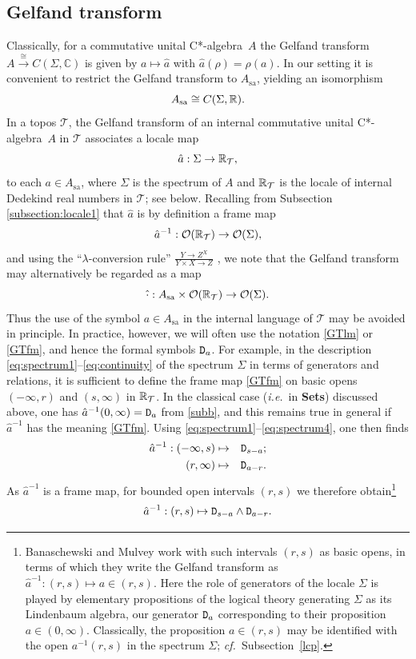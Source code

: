 \documentclass[12pt]{article}
\newcommand{\beq}{\begin{equation}}
\newcommand{\eeq}{\end{equation}}
\newcommand{\Sets}{\mbox{\textbf{Sets}}}
\newcommand{\ca}{C*-algebra} \newcommand{\jba}{JB-algebra}
\newcommand{\raw}{\rightarrow} \newcommand{\rat}{\mapsto}
\newcommand{\inv}{^{-1}}
\newcommand{\er}{\eqref}
\newcommand{\lm}{\lambda} \newcommand{\Lm}{\Lambda}
\newcommand{\rh}{\rho} \newcommand{\sg}{\sigma}
\newcommand{\Sg}{\Sigma} \newcommand{\ta}{\tau} \newcommand{\ph}{\phi}
\newcommand{\CO}{{\mathcal O}} \newcommand{\CP}{{\mathcal P}}
\newcommand{\CT}{{\mathcal T}} \newcommand{\CV}{{\mathcal V}}
\newcommand{\C}{{\mathbb C}} \newcommand{\D}{{\mathbb D}}
\newcommand{\sa}{\ensuremath{_{\mathrm{sa}}}}
\newcommand{\prop}[1]{\ensuremath{\mbox{\texttt{#1}}}}
\newcommand{\ie}{\textit{i.e.}}
\begin{document}
\subsection{Gelfand transform}\label{sec:GT}

Classically, for a commutative unital \ca\ $A$ the Gelfand transform
$A\stackrel{\cong}{\raw} C(\Sigma,\C)$
 is given by $a\mapsto \hat{a}$ with $\hat{a}(\rh)=\rh(a)$. In our setting it is
 convenient to restrict the Gelfand transform to $A\sa$, yielding an isomorphism
 \beq
 A\sa\cong C(\Sg,\R)  \label{GTisoR}.
 \eeq
 In a topos $\CT$,
 the Gelfand transform of an internal commutative unital \ca\ ${A}$ in $\CT$
associates a locale map
\beq \hat{a}:\Sg\raw \R_{\CT},\label{GTlm}\eeq
 to each $a\in{A\sa}$, where
$\Sg$ is the spectrum of ${A}$ and
 $\R_{\CT}$ is the locale of internal Dedekind real numbers in
$\CT$; see below. Recalling from Subsection \ref{subsection:locale1} that
 $\hat{a}$ is by definition a frame map
 \beq \hat{a}\inv: \CO(\R_{\CT})\raw\CO(\Sg), \label{GTfm}\eeq
 and using the ``$\lm$-conversion rule'' $\frac{Y\raw Z^X}{Y\times X\raw Z}$
  \cite[\S I.6]{maclanemoerdijk92},
 we note that  the Gelfand transform may alternatively  be regarded as a map
\beq
\hat{\cdot}: A\sa\times \CO(\R_{\CT})\raw \CO(\Sg).\label{GTlc}\eeq
 Thus
 the use of the symbol $a\in A\sa$ in the internal language of $\CT$ may be
avoided in principle.
 In practice, however, we will often use the notation \er{GTlm} or \er{GTfm},
and hence the formal symbols $\prop{D}_a$.
For example, in the description \er{eq:spectrum1}--\er{eq:continuity} of
the spectrum $\Sg$ in terms of generators and relations, it is
sufficient to define the frame map \er{GTfm} on basic opens $(-\infty,r)$ and
$(s,\infty)$ in $\R_{\CT}$. In the classical case (\ie\ in \Sets) discussed above,
one has
$\hat{a}\inv(0,\infty)=\prop{D}_a$ from \er{subb}, and this remains true in
general if $\hat{a}\inv$ has the meaning \er{GTfm}.
 Using \er{eq:spectrum1}--\er{eq:spectrum4}, one then finds
\begin{eqnarray}
\hat{a}\inv : (-\infty,s) &\mapsto&  \prop{D}_{s-a};\label{GT0}\\
 (r,\infty) &\mapsto & \prop{D}_{a-r}. \label{GT}
\end{eqnarray}
As $\hat{a}\inv$ is a frame map, for bounded open intervals $(r,s)$
 we therefore obtain\footnote{Banaschewski and Mulvey
\cite{banaschewskimulvey06} work with such intervals $(r,s)$ as basic opens, in
terms
of which they write the Gelfand transform as $\hat{a}\inv : (r,s) \mapsto a\in
(r,s)$. Here the role of generators of the locale $\Sg$ is played by elementary
propositions of the logical theory generating $\Sg$ as its Lindenbaum algebra,
our generator $\prop{D}_a$
corresponding to their proposition $a\in(0,\infty)$. Classically,  the
proposition
$a\in (r,s)$ may be identified with the open
$a\inv(r,s)$ in the spectrum $\Sg$; {\it cf.}\ Subsection~\ref{lcp}.}
\beq \hat{a}\inv : (r,s) \mapsto \prop{D}_{s-a}\wedge \prop{D}_{a-r}.\label{GT2}
\eeq
\end{document}
